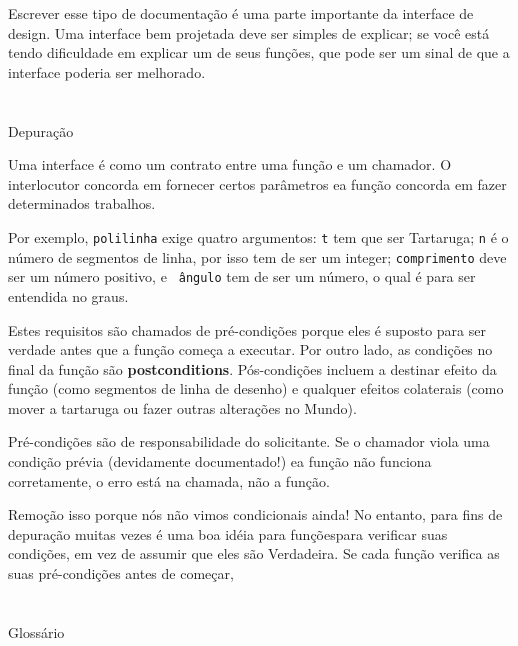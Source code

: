 \documentclass[10pt]{book}
\begin{document}
Escrever esse tipo de documentação é uma parte importante da interface de
design. Uma interface bem projetada deve ser simples de explicar;
se você está tendo dificuldade em explicar um de seus funções,
que pode ser um sinal de que a interface poderia ser melhorado.


\section{} Depuração

Uma interface é como um contrato entre uma função e um chamador.
O interlocutor concorda em fornecer certos parâmetros ea função
concorda em fazer determinados trabalhos.

Por exemplo, {\tt polilinha} exige quatro argumentos: {\tt t} tem que ser
Tartaruga; {\tt n} é o número de segmentos de linha, por isso tem de ser um
integer; {\tt comprimento} deve ser um número positivo, e {\tt
  ângulo} tem de ser um número, o qual é para ser entendida no graus.

Estes requisitos são chamados de pré-condições {\bf} porque eles
é suposto para ser verdade antes que a função começa a executar.
Por outro lado, as condições no final da função são
{\bf postconditions}. Pós-condições incluem a destinar
efeito da função (como segmentos de linha de desenho) e qualquer
efeitos colaterais (como mover a tartaruga ou fazer outras alterações
no Mundo).

Pré-condições são de responsabilidade do solicitante. Se o chamador
viola uma condição prévia (devidamente documentado!) ea função
não funciona corretamente, o erro está na chamada, não a função.

Remoção isso porque nós não vimos condicionais ainda!
No entanto, para fins de depuração muitas vezes é uma boa idéia para
funçõespara verificar suas condições, em vez de assumir que eles são
Verdadeira. Se cada função verifica as suas pré-condições antes de começar,


\section{} Glossário
\end{document}

